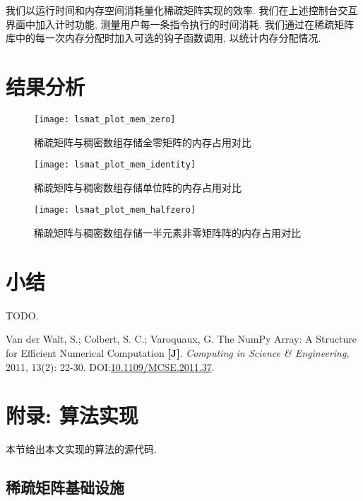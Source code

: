 我们以运行时间和内存空间消耗量化稀疏矩阵实现的效率. 我们在上述控制台交互界面中加入计时功能, 测量用户每一条指令执行的时间消耗. 我们通过在稀疏矩阵库中的每一次内存分配时加入可选的钩子函数调用, 以统计内存分配情况.

\section{结果分析}

\begin{figure}
    \centering
    \texttt{[image: lsmat\_plot\_mem\_zero]}
    \caption{稀疏矩阵与稠密数组存储全零矩阵的内存占用对比}
    \label{fig_lsmat_plot_mem_zero}
\end{figure}

\begin{figure}
    \centering
    \texttt{[image: lsmat\_plot\_mem\_identity]}
    \caption{稀疏矩阵与稠密数组存储单位阵的内存占用对比}
    \label{fig_lsmat_plot_mem_identity}
\end{figure}

\begin{figure}
    \centering
    \texttt{[image: lsmat\_plot\_mem\_halfzero]}
    \caption{稀疏矩阵与稠密数组存储一半元素非零矩阵阵的内存占用对比}
    \label{fig_lsmat_plot_mem_halfzero}
\end{figure}

\section{小结}

TODO.

\begin{thebibliography}{}

 Van der Walt, S.; Colbert, S. C.; Varoquaux, G. The NumPy Array: A Structure for Efficient Numerical Computation \textbf{[J]}. \textit{Computing in Science \& Engineering}, 2011, 13(2): 22-30. DOI:\href{https://doi.org/10.1109/MCSE.2011.37}{10.1109/MCSE.2011.37}.

\end{thebibliography}

\appendix

\section{附录: 算法实现}

本节给出本文实现的算法的源代码.

\subsection{稀疏矩阵基础设施}

